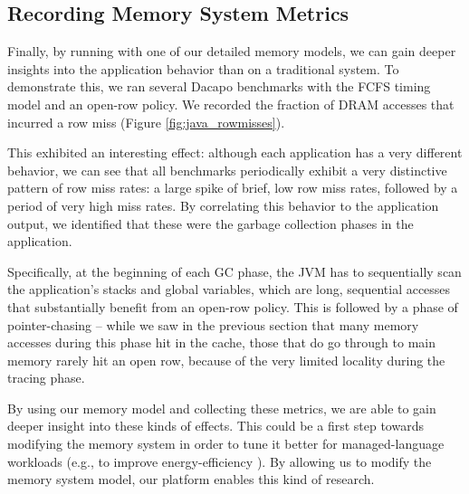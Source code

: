 \subsection{Recording Memory System Metrics}

Finally, by running with one of our detailed memory models, we can gain deeper
insights into the application behavior than on a traditional system. To
demonstrate this, we ran several Dacapo benchmarks with the FCFS timing model
and an open-row policy. We recorded the fraction of DRAM accesses that incurred
a row miss (Figure \ref{fig:java_rowmisses}).

This exhibited an interesting effect: although each application has a very
different behavior, we can see that all benchmarks periodically exhibit a very
distinctive pattern of row miss rates: a large spike of brief, low row miss
rates, followed by a period of very high miss rates. By correlating this
behavior to the application output, we identified that these were the garbage
collection phases in the application.

Specifically, at the beginning of each GC phase, the JVM has to sequentially
scan the application's stacks and global variables, which are long, sequential
accesses that substantially benefit from an open-row policy. This is followed
by a phase of pointer-chasing -- while we saw in the previous section that many
memory accesses during this phase hit in the cache, those that do go through to
main memory rarely hit an open row, because of the very limited locality during
the tracing phase.

By using our memory model and collecting these metrics, we are able to gain
deeper insight into these kinds of effects. This could be a first step towards
modifying the memory system in order to tune it better for managed-language
workloads (e.g., to improve energy-efficiency
\cite{Cao:2012:YYP:2337159.2337185}). By allowing us to modify the memory
system model, our platform enables this kind of research.
